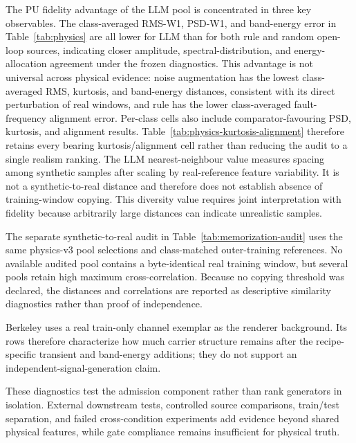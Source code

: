 \documentclass[a4paper,fleqn]{cas-sc}
\begin{document}
The PU fidelity advantage of the LLM pool is concentrated in three key
observables. The class-averaged RMS-W1, PSD-W1, and band-energy error in
Table~\ref{tab:physics} are all lower for LLM than for both rule and random
open-loop sources, indicating closer amplitude, spectral-distribution, and
energy-allocation agreement under the frozen diagnostics. This advantage is
not universal across physical evidence: noise augmentation has the lowest
class-averaged RMS, kurtosis, and band-energy distances, consistent with its
direct perturbation of real windows, and rule has the lower class-averaged
fault-frequency alignment error. Per-class cells also include
comparator-favouring PSD,
kurtosis, and alignment results. Table~\ref{tab:physics-kurtosis-alignment}
therefore retains every bearing kurtosis/alignment cell rather than reducing
the audit to a single realism ranking. The LLM nearest-neighbour value measures
spacing among synthetic samples after scaling by real-reference feature
variability. It is not a synthetic-to-real distance and therefore does not
establish absence of training-window copying. This diversity value requires
joint interpretation with fidelity because arbitrarily large distances can
indicate unrealistic samples.





The separate synthetic-to-real audit in Table~\ref{tab:memorization-audit}
uses the same physics-v3 pool selections and class-matched outer-training
references. No available audited pool contains a byte-identical real training
window, but several pools retain high maximum cross-correlation. Because no
copying threshold was declared, the distances and correlations are reported as
descriptive similarity diagnostics rather than proof of independence.



Berkeley uses a real train-only channel exemplar as the renderer background.
Its rows therefore characterize how much carrier structure remains after the
recipe-specific transient and band-energy additions; they do not support an
independent-signal-generation claim.

These diagnostics test the admission component rather than rank generators in
isolation. External downstream tests, controlled source comparisons, train/test
separation, and failed cross-condition experiments add evidence beyond shared
physical features, while gate compliance remains insufficient for physical
truth.
\end{document}

